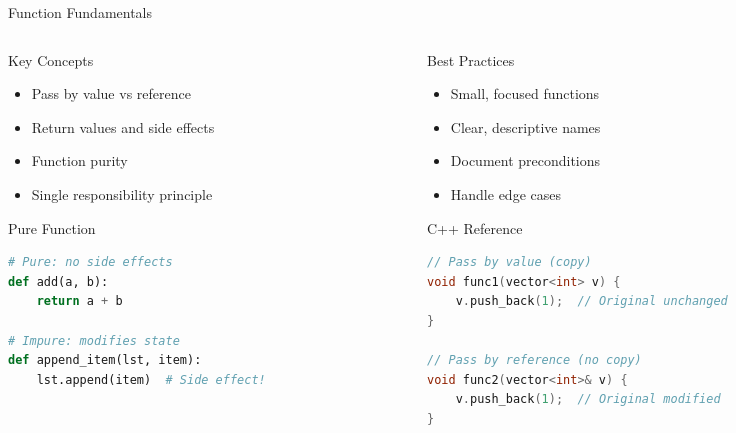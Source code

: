\documentclass[aspectratio=169,xcolor=dvipsnames]{beamer}
\begin{document}
\begin{frame}[fragile]{Function Fundamentals}
  \begin{columns}
    \begin{column}{0.48\textwidth}
      \begin{block}{Key Concepts}
        \begin{itemize}
          \item Pass by value vs reference
          \item Return values and side effects
          \item Function purity
          \item Single responsibility principle
        \end{itemize}
      \end{block}

      \vspace{0.2cm}

      \begin{exampleblock}{Pure Function}
        \begin{lstlisting}[language=Python,basicstyle=\tiny\ttfamily]
# Pure: no side effects
def add(a, b):
    return a + b

# Impure: modifies state
def append_item(lst, item):
    lst.append(item)  # Side effect!
        \end{lstlisting}
      \end{exampleblock}
    \end{column}
    \begin{column}{0.48\textwidth}
      \begin{block}{Best Practices}
        \begin{itemize}
          \item Small, focused functions
          \item Clear, descriptive names
          \item Document preconditions
          \item Handle edge cases
        \end{itemize}
      \end{block}

      \vspace{0.2cm}

      \begin{exampleblock}{C++ Reference}
        \begin{lstlisting}[language=C++,basicstyle=\tiny\ttfamily]
// Pass by value (copy)
void func1(vector<int> v) {
    v.push_back(1);  // Original unchanged
}

// Pass by reference (no copy)
void func2(vector<int>& v) {
    v.push_back(1);  // Original modified
}
        \end{lstlisting}
      \end{exampleblock}
    \end{column}
  \end{columns}
\end{frame}
\end{document}
